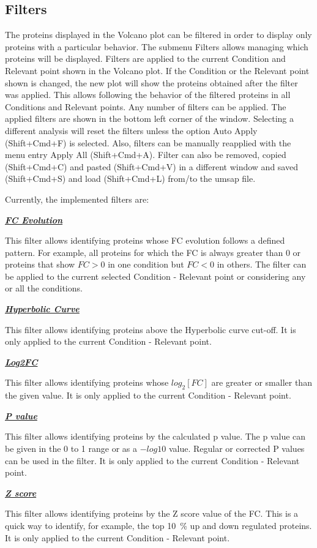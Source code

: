\newpage
\subsection{Filters}

The proteins displayed in the Volcano plot can be filtered in order to display only
proteins with a particular behavior. The submenu Filters allows managing which
proteins will be displayed. Filters are applied to the current Condition and Relevant
point shown in the Volcano plot. If the Condition or the Relevant point shown is
changed, the new plot will show the proteins obtained after the filter was applied.
This allows following the behavior of the filtered proteins in all Conditions and
Relevant points. Any number of filters can be applied. The applied filters are shown
in the bottom left corner of the window. Selecting a different analysis will reset
the filters unless the option Auto Apply (Shift+Cmd+F) is selected. Also, filters
can be manually reapplied with the menu entry Apply All (Shift+Cmd+A). Filter can
also be removed, copied (Shift+Cmd+C) and pasted (Shift+Cmd+V) in a different window
and saved (Shift+Cmd+S) and load (Shift+Cmd+L) from/to the umsap file.

Currently, the implemented filters are:

\textbf{\textit{\underline{FC Evolution}}}

This filter allows identifying proteins whose FC evolution follows a defined pattern.
For example, all proteins for which the FC is always greater than \num{0} or proteins
that show $FC > 0$ in one condition but $FC < 0$ in others. The filter can be applied
to the current selected Condition - Relevant point or considering any or all the
conditions.

\textbf{\textit{\underline{Hyperbolic Curve}}}

This filter allows identifying proteins above the Hyperbolic curve cut-off. It is
only applied to the current Condition - Relevant point.

\textbf{\textit{\underline{Log2FC}}}

This filter allows identifying proteins whose $log_2[FC]$ are greater or smaller
than the given value. It is only applied to the current Condition - Relevant point.

\textbf{\textit{\underline{P value}}}

This filter allows identifying proteins by the calculated p value. The p value
can be given in the 0 to 1 range or as a $-log10$ value. Regular or corrected P
values can be used in the filter. It is only applied to the current Condition -
Relevant point.

\textbf{\textit{\underline{Z score}}}

This filter allows identifying proteins by the Z score value of the FC. This is a
quick way to identify, for example, the top \SI{10}{\percent} up and down regulated
proteins. It is only applied to the current Condition - Relevant point.


